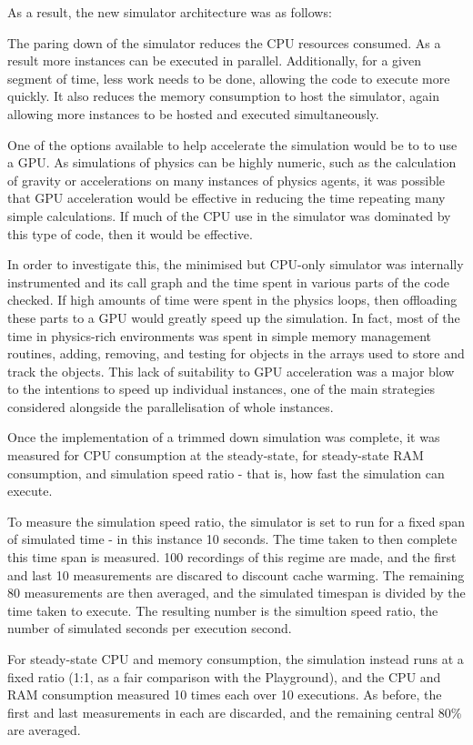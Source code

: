 As a result, the new simulator architecture was as follows: 

The paring down of the simulator reduces the CPU resources consumed. As a result
more instances can be executed in parallel. Additionally, for a given segment of
time, less work needs to be done, allowing the code to execute more quickly. It
also reduces the memory consumption to host the simulator, again allowing more
instances to be hosted and executed simultaneously.

One of the options available to help accelerate the simulation would be to to
use a GPU. As simulations of physics can be highly numeric, such as the
calculation of gravity or accelerations on many instances of physics agents,
it was possible that GPU acceleration would be effective in reducing the time
repeating many simple calculations. If much of the CPU use in the simulator was
dominated by this type of code, then it would be effective.

In order to investigate this, the minimised but CPU-only simulator was
internally instrumented and its call graph and the time spent in various parts
of the code checked. If high amounts of time were spent in the physics loops,
then offloading these parts to a GPU would greatly speed up the simulation. In
fact, most of the time in physics-rich environments was spent in simple memory
management routines, adding, removing, and testing for objects in the arrays
used to store and track the objects. This lack of suitability to GPU
acceleration was a major blow to the intentions to speed up individual
instances, one of the main strategies considered alongside the parallelisation
of whole instances.


Once the implementation of a trimmed down simulation was complete, it was
measured for CPU consumption at the steady-state, for steady-state RAM
consumption, and simulation speed ratio - that is, how fast the simulation can
execute.

To measure the simulation speed ratio, the simulator is set to run for a fixed
span of simulated time - in this instance 10 seconds. The time taken to then
complete this time span is measured. 100 recordings of this regime are made,
and the first and last 10 measurements are discared to discount cache warming.
The remaining 80 measurements are then averaged, and the simulated timespan is
divided by the time taken to execute. The resulting number is the simultion
speed ratio, the number of simulated seconds per execution second.

For steady-state CPU and memory consumption, the simulation instead runs at a
fixed ratio (1:1, as a fair comparison with the Playground), and the CPU and
RAM consumption measured 10 times each over 10 executions. As before, the first
and last measurements in each are discarded, and the remaining central 80\%
are averaged.
